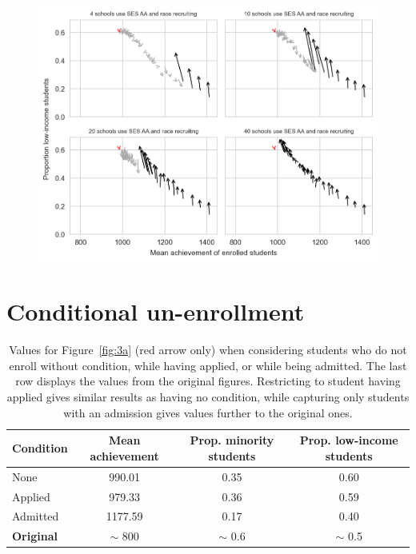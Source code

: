 \begin{appendices}
\begin{figure}[H]
  \centering
  \includegraphics[width=.89\textwidth]{figures/figD3.png}
  \caption{}
  \label{fig:d3}
\end{figure}

\section{Conditional un-enrollment}\label{sec:unenroll}

\begin{table}[H]
    \centering
    \begin{tabular}{l c c c} \toprule
      \textbf{Condition} & \textbf{Mean achievement} & \textbf{Prop. minority students} & \textbf{Prop. low-income students} \\ \midrule
      None               & 990.01                    & 0.35                             & 0.60                               \\
      Applied            & 979.33                    & 0.36                             & 0.59                               \\
      Admitted           & 1177.59                   & 0.17                             & 0.40                               \\ \midrule
      \textbf{Original}  & $\sim$ 800                & $\sim$ 0.6                       & $\sim$ 0.5                         \\ \bottomrule
    \end{tabular}
    \caption{Values for Figure~\ref{fig:3a} (red arrow only) when considering students who do not enroll without condition, while having applied, or while being admitted. The last row displays the values from the original figures.
      Restricting to student having applied gives similar results as having no condition, while capturing only students with an admission gives values further to the original ones.}
    \label{tab:unenroll}
\end{table}


\end{appendices}

\clearpage
